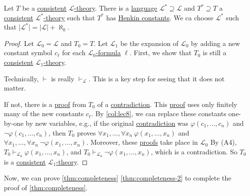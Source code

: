 \begin{theorem}\label{thm:lec8}
	Let \(T\) be a \hyperref[def:consistent]{consistent} \hyperref[def:theory]{\(\mathcal{L} \)-theory}. There is a \hyperref[def:language]{language} \(\mathcal{L} ^{\ast} \supseteq \mathcal{L}\) and \(T^{\ast} \supseteq T\) a \hyperref[def:consistent]{consistent} \hyperref[def:theory]{\(\mathcal{L} ^{\ast} \)-theory} such that \(T^{\ast} \) has \hyperref[def:Henkin-constant]{Henkin constants}. We ca choose \(\mathcal{L} ^{\ast} \) such that \(\vert \mathcal{L} ^{\ast} \vert = \vert \mathcal{L} \vert + \aleph _0\).
\end{theorem}
\begin{proof}
	Let \(\mathcal{L} _0 = \mathcal{L} \) and \(T_0 = T\). Let \(\mathcal{L} _1\) be the expansion of \(\mathcal{L} _0\) by adding a new constant symbol \(c_{\ell } \) for each \hyperref[def:formula]{\(\mathcal{L} _0\)-formula} \(\ell \). First, we show that \(T_0\) is still a \hyperref[def:consistent]{consistent} \hyperref[def:theory]{\(\mathcal{L} _1\)-theory}.

	\begin{remark}
		Technically, \(\vdash \) is really \(\vdash _{\mathcal{L} }\). This is a key step for seeing that it does not matter.
	\end{remark}

	If not, there is a \hyperref[def:proof]{proof} from \(T_0\) of a \hyperref[prop:proof-by-contradiction]{contradiction}. This \hyperref[def:proof]{proof} uses only finitely many of the new constants \(c_{\ell } \). By \autoref{col:lec8}, we can replace these constants one-by-one by new variables, e.g., if the original \hyperref[prop:proof-by-contradiction]{contradiction} was \(\varphi (c_1, \ldots , c_n)\) and \(\lnot \varphi (c_1, \ldots , c_n)\), then \(T_0\) proves \(\forall x_1, \ldots , \forall x_n\ \varphi (x_1, \ldots , x_n)\) and \(\forall x_1, \ldots , \forall x_n\ \lnot \varphi (x_1, \ldots , x_n)\). Moreover, these \hyperref[def:proof]{proofs} take place in \(\mathcal{L} _0\) By (A4), \(T_0 \vdash _{\mathcal{L} _0} \varphi (x_1, \ldots , x_n)\), and \(T_0 \vdash _{\mathcal{L} _0} \lnot \varphi (x_1, \ldots , x_n)\), which is a contradiction. So \(T_0\) is a \hyperref[def:consistent]{consistent} \hyperref[def:theory]{\(\mathcal{L} _1\)-theory}.
\end{proof}

Now, we can prove \autoref{thm:completeness} \autoref{thm:completeness-2} to complete the proof of \autoref{thm:completeness}.

